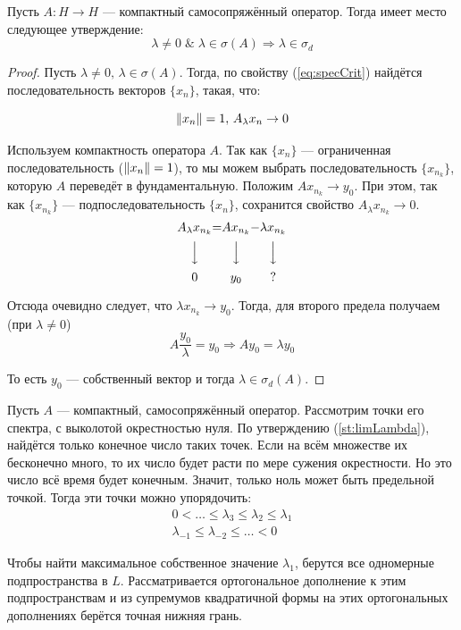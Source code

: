 \documentclass[12pt]{article}
\begin{document}
			\begin{theorem}
				Пусть $A: H \rightarrow H$ --- компактный самосопряжённый оператор. Тогда имеет место следующее утверждение:
				$$\lambda \neq 0 \;\&\; \lambda \in \sigma(A) \Rightarrow \lambda \in \sigma_d $$
			\end{theorem}
			\begin{proof}
				Пусть $\lambda \neq 0,\, \lambda \in \sigma(A)$. Тогда, по свойству (\ref{eq:specCrit}) найдётся последовательность 
				векторов $\{x_n\}$, такая, что:
		
				$$\left\| x_n \right\| = 1,\, A_{\lambda}x_n \rightarrow 0$$
		
				Используем компактность оператора $A$. Так как $\{x_n\}$ --- ограниченная последовательность ($\left\| x_n \right\| = 1$), то
				мы можем выбрать последовательность $\{x_{n_k}\}$, которую $A$ переведёт в фундаментальную. 
				Положим $Ax_{n_k}\rightarrow y_0$. При этом, так как $\{x_{n_k}\}$ --- подпоследовательность $\{x_{n}\}$, 
				сохранится свойство $A_{\lambda}x_{n_k} \rightarrow 0$.
				$$
				\begin{CD}
					A_{\lambda}x_{n_k} @.=@. Ax_{n_k} @.-@. \lambda x_{n_k} \\
					@VVV @. @VVV @. @VVV \\
					0 @.@. y_0 @.@. ?
				\end{CD}
				$$
		
				Отсюда очевидно следует, что $\lambda x_{n_k} \rightarrow y_0$. Тогда, для второго предела получаем (при $\lambda \neq 0$)
				$$A\dfrac{y_0}{\lambda} = y_0 \Rightarrow Ay_0 = \lambda y_0$$
		
				То есть $y_0$ --- собственный вектор и тогда $\lambda \in \sigma_d(A)$.
			\end{proof}
	
			Пусть $A$ --- компактный, самосопряжённый оператор. Рассмотрим точки его спектра, с выколотой окрестностью нуля. 
			По утверждению (\ref{st:limLambda}), найдётся только конечное число таких точек. Если на всём множестве их бесконечно много, 
			то их число будет расти по мере сужения окрестности. Но это число всё время будет конечным. Значит, только ноль может быть
			предельной точкой. Тогда эти точки можно упорядочить:
			\begin{gather*}
				0 < \dots \leq \lambda_3 \leq \lambda_2 \leq \lambda_1 \\
				\lambda_{-1} \leq \lambda_{-2} \leq \dots < 0
			\end{gather*}
	
			{\color{gray}Чтобы найти максимальное собственное значение $\lambda_1$, берутся все одномерные подпространства в $L$. 
			Рассматривается ортогональное дополнение к этим подпространствам и из супремумов квадратичной формы на
			этих ортогональных дополнениях берётся точная нижняя грань.}
	
\end{document}
